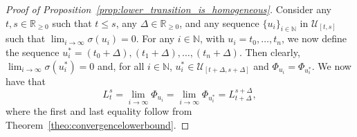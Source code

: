 \documentclass[10pt,a4paper]{paper}
\theoremstyle{definition}
\newcommand{\nats}{\mathbb{N}}
\newcommand{\reals}{\mathbb{R}}
\newcommand{\realsnonneg}{\reals_{\geq 0}}
\begin{document}
\begin{proof}[Proof of Proposition~\ref{prop:lower_transition_is_homogeneous}]
Consider any $t,s\in\realsnonneg$ such that $t\leq s$, any $\Delta\in\realsnonneg$, and any sequence $\{u_i\}_{i\in\nats}$ in $\mathcal{U}_{[t,s]}$ such that $\lim_{i\to\infty}\sigma(u_i)=0$. %
For any $i\in\nats$, with $u_i=t_0,\ldots,t_n$, we now define the sequence $u_i^*=(t_0+\Delta),(t_1+\Delta),\ldots,(t_n+\Delta)$. Then clearly, $\lim_{i\to\infty}\sigma(u_i^*)=0$ and, for all $i\in\nats$, $u_i^*\in\mathcal{U}_{[t+\Delta,s+\Delta]}$ and $\Phi_{u_i}=\Phi_{u_i^*}$.
We now have that
\begin{equation*}
L_t^s=\lim_{i\to\infty}\Phi_{u_i}=\lim_{i\to\infty}\Phi_{u_i^*}=L_{t+\Delta}^{s+\Delta},
\end{equation*}
where the first and last equality follow from Theorem~\ref{theo:convergencelowerbound}.
\end{proof}
\end{document}
